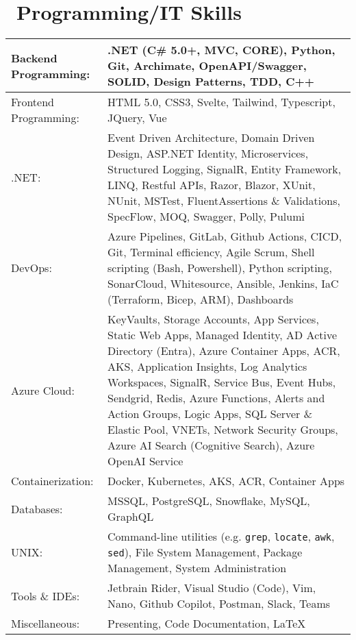\section{\faTerminal\ Programming/IT Skills}
\begin{tabular}{||p{5cm}|p{8cm}||}
\hline
Backend Programming: &  .NET (C\# 5.0+, MVC, CORE), Python, Git, Archimate, OpenAPI/Swagger, SOLID, Design Patterns, TDD, C++ \\
\hline
Frontend Programming: & HTML 5.0, CSS3, Svelte, Tailwind, Typescript, JQuery, Vue \\
\hline
.NET:& Event Driven Architecture, Domain Driven Design, ASP.NET Identity, Microservices, Structured Logging, SignalR, Entity Framework, LINQ, Restful APIs, Razor, Blazor, XUnit, NUnit, MSTest, FluentAssertions \& Validations, SpecFlow, MOQ, Swagger, Polly, Pulumi \\
\hline
DevOps: & Azure Pipelines, GitLab, Github Actions, CI\/CD, Git, Terminal efficiency, Agile Scrum, Shell scripting (Bash, Powershell), Python scripting, SonarCloud, Whitesource, Ansible, Jenkins, IaC (Terraform, Bicep, ARM), Dashboards \\
\hline
Azure Cloud: & KeyVaults, Storage Accounts, App Services, Static Web Apps,
Managed Identity, AD Active Directory (Entra), Azure
Container Apps, ACR, AKS,
Application Insights, Log Analytics Workspaces,
SignalR, Service Bus, Event Hubs, Sendgrid, Redis,
Azure Functions, Alerts and Action Groups, Logic Apps,
SQL Server \& Elastic Pool, VNETs, Network Security Groups,
Azure AI Search (Cognitive Search), Azure OpenAI Service \\
\hline
Containerization: & Docker, Kubernetes, AKS, ACR, Container Apps \\
\hline
Databases: & MSSQL, PostgreSQL, Snowflake, MySQL, GraphQL \\
\hline
UNIX: & Command-line utilities (e.g. \verb|grep|, \verb|locate|, \verb|awk|, \verb|sed|), File System Management, Package Management, System Administration \\
\hline
Tools \& IDEs: & Jetbrain Rider, Visual Studio (Code), Vim, Nano, Github Copilot, Postman, Slack, Teams \\
\hline
Miscellaneous: & Presenting, Code Documentation, \LaTeX \\
\hline
\end{tabular}